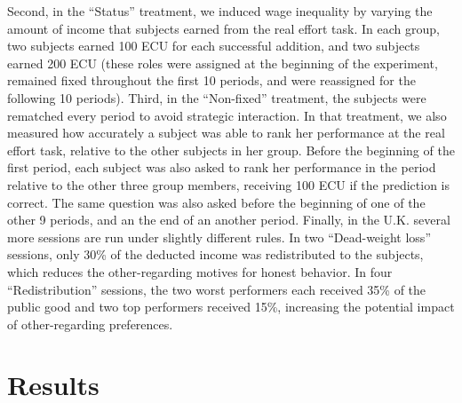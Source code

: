 \documentclass[12pt]{article}
\begin{document}
\par Second, in the ``Status'' treatment, we induced wage inequality by varying the amount of income that subjects earned from the real effort task. In each group, two subjects earned 100 ECU for each successful addition, and two subjects earned 200 ECU (these roles were  assigned at the beginning of the experiment, remained fixed throughout the first 10 periods, and were reassigned for the following 10 periods). Third, in the ``Non-fixed'' treatment, the subjects were rematched every period to avoid strategic interaction. In that treatment, we also measured how accurately a subject was able to rank her performance at the real effort task, relative to the other subjects in her group. Before the beginning of the first period, each subject was also asked to rank her performance in the period relative to the other three group members, receiving 100 ECU if the prediction is correct. The same question was also asked before the beginning of one of the other 9 periods, and an the end of an another period. Finally, in the U.K. several more sessions are run under slightly different rules. In two ``Dead-weight loss'' sessions, only 30\% of the deducted income was redistributed to the subjects, which reduces the other-regarding motives for honest behavior. In four ``Redistribution'' sessions, the two worst performers each received 35\% of the public good and two top performers received 15\%, increasing the potential impact of other-regarding preferences.\footnotemark{}

\section*{Results}


\end{document}
